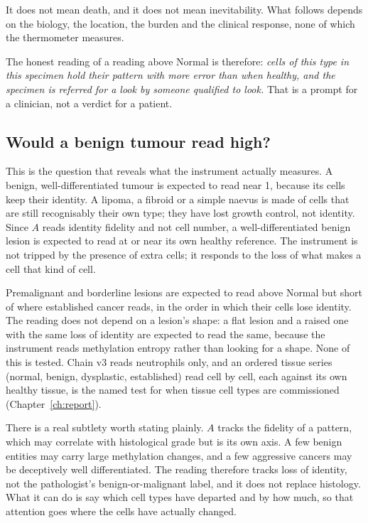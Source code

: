 It does not mean death, and it does not mean inevitability. What follows depends on the biology, the location, the burden and the
clinical response, none of which the thermometer measures.

The honest reading of a reading above Normal is therefore: \emph{cells of this type in this specimen hold their pattern with more error
than when healthy, and the specimen is referred for a look by someone qualified to look.} That is a prompt for a clinician, not a verdict
for a patient.

\subsection{Would a benign tumour read high?}\label{sec:ag_benign}

This is the question that reveals what the instrument actually measures. A benign, well-differentiated tumour is expected to read near 1,
because its cells keep their identity. A lipoma, a fibroid or a simple naevus is made of cells that are still recognisably their own type;
they have lost growth control, not identity. Since $A$ reads identity fidelity and not cell number, a well-differentiated benign lesion is
expected to read at or near its own healthy reference. The instrument is not tripped by the presence of extra cells; it responds to the
loss of what makes a cell that kind of cell. \prediction

Premalignant and borderline lesions are expected to read above Normal but short of where established cancer reads, in the order in which
their cells lose identity. \prediction{} The reading does not depend on a lesion's shape: a flat lesion and a raised one with the same loss
of identity are expected to read the same, because the instrument reads methylation entropy rather than looking for a shape.
\prediction{} None of this is tested. Chain v3 reads neutrophils only, and an ordered tissue series (normal, benign, dysplastic,
established) read cell by cell, each against its own healthy tissue, is the named test for when tissue cell types are commissioned
(Chapter~\ref{ch:report}). \openprob

There is a real subtlety worth stating plainly. $A$ tracks the fidelity of a pattern, which may correlate with histological grade but is
its own axis. A few benign entities may carry large methylation changes, and a few aggressive cancers may be deceptively well
differentiated. The reading therefore tracks loss of identity, not the pathologist's benign-or-malignant label, and it does not replace
histology. What it can do is say which cell types have departed and by how much, so that attention goes where the cells have actually
changed. \interp

